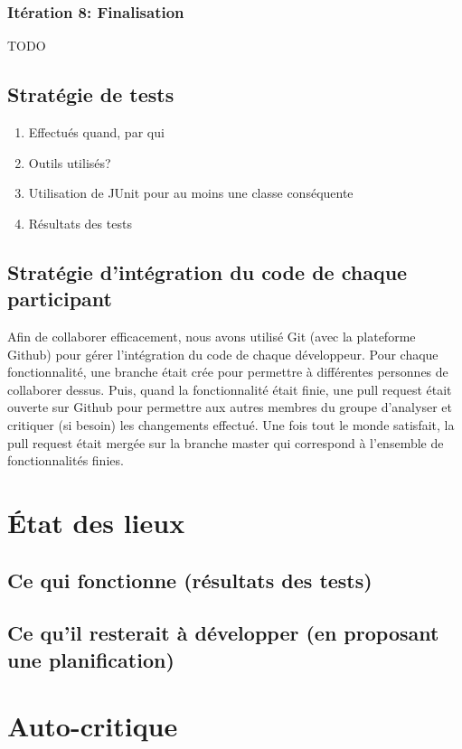 \documentclass[a4paper,11pt]{article}
\begin{document}
	\subsubsection{Itération 8: Finalisation}
	TODO
	
	
	\subsection{Stratégie de tests}
	\begin{enumerate}
		\item Effectués quand, par qui
		\item Outils utilisés?
		\item Utilisation de JUnit pour au moins une classe conséquente
		\item Résultats des tests
	\end{enumerate}

	\subsection{Stratégie d'intégration du code de chaque participant}
	Afin de collaborer efficacement, nous avons utilisé Git (avec la plateforme Github) pour gérer l'intégration du code de chaque développeur. Pour chaque fonctionnalité, une branche était crée pour permettre à différentes personnes de collaborer dessus. Puis, quand la fonctionnalité était finie, une pull request était ouverte sur Github pour permettre aux autres membres du groupe d'analyser et critiquer (si besoin) les changements effectué. Une fois tout le monde satisfait, la pull request était mergée sur la branche master qui correspond à l'ensemble de fonctionnalités finies.

	\section{État des lieux}
	
	
	\subsection{Ce qui fonctionne (résultats des tests)}
	
	
	\subsection{Ce qu'il resterait à développer (en proposant une planification)}
	
	
	\section{Auto-critique}
	
\end{document}
